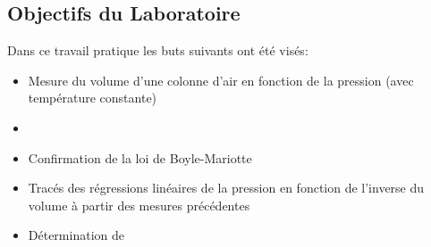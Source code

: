 \subsection*{Objectifs du Laboratoire}
Dans ce travail pratique les buts suivants ont été visés:
\begin{itemize}
    \item{Mesure du volume d'une colonne d'air en fonction de la pression (avec température constante)}
    \item{}
    \item{Confirmation de la loi de Boyle-Mariotte}
    \item{Tracés des régressions linéaires de la pression en fonction de l'inverse du volume à partir des mesures précédentes}
    \item{Détermination de }
\end{itemize}
